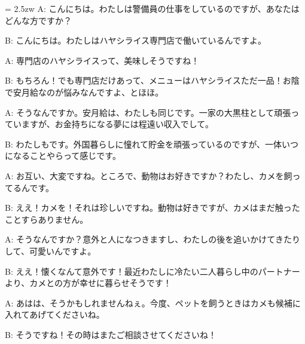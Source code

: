 \documentclass[11pt]{amsart}
\title{}
\author{}
\newenvironment{hangall}[1]{\hangindent = 2.5zw\everypar{\hangindent = 2.5zw}}{}
\begin{document}
\maketitle
\begin{hangall}{}%
A: こんにちは。わたしは警備員の仕事をしているのですが、あなたはどんな方ですか？

B: こんにちは。わたしはハヤシライス専門店で働いているんですよ。

A: 専門店のハヤシライスって、美味しそうですね！

B: もちろん！でも専門店だけあって、メニューはハヤシライスただ一品！お陰で安月給なのが悩みなんですよ、とほほ。

A: そうなんですか。安月給は、わたしも同じです。一家の大黒柱として頑張っていますが、お金持ちになる夢には程遠い収入でして。

B: わたしもです。外国暮らしに憧れて貯金を頑張っているのですが、一体いつになることやらって感じです。

A: お互い、大変ですね。ところで、動物はお好きですか？わたし、カメを飼ってるんです。

B: ええ！カメを！それは珍しいですね。動物は好きですが、カメはまだ触ったことすらありません。

A: そうなんですか？意外と人になつきますし、わたしの後を追いかけてきたりして、可愛いんですよ。

B: ええ！懐くなんて意外です！最近わたしに冷たい二人暮らし中のパートナーより、カメとの方が幸せに暮らせそうです！

A: あはは、そうかもしれませんねぇ。今度、ペットを飼うときはカメも候補に入れてあげてくださいね。

B: そうですね！その時はまたご相談させてくださいね！
\end{hangall}
\end{document}
